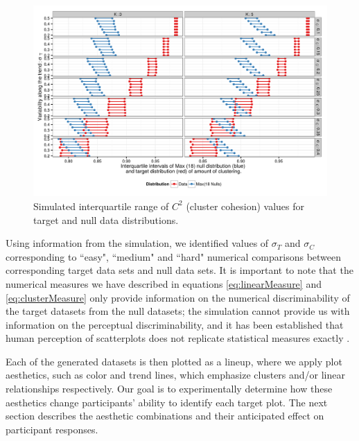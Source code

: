 \documentclass[11pt]{isuthesis}\usepackage[]{graphicx}\usepackage[]{color}
\newenvironment{knitrout}{}{} %
\begin{document}
\begin{figure}[ht]\centering
\begin{knitrout}
\color{fgcolor}

{\centering \includegraphics[width=.8\linewidth]{Figure/FeatureHierarchy/fig-simulationparameters-cluster-1} 

}



\end{knitrout}
\caption[Simulated interquartile range of $C^2$ cluster cohesion values]{Simulated interquartile range of $C^2$ (cluster cohesion) values for target and null data distributions. \label{fig:simulationClusterIntervals}}
\end{figure}

Using information from the simulation, we identified values of $\sigma_T$ and $\sigma_C$ corresponding to ``easy", ``medium" and ``hard" numerical comparisons between corresponding target data sets and null data sets. It is important to note that the numerical measures we have described in equations \eqref{eq:linearMeasure} and \eqref{eq:clusterMeasure} only provide information on the numerical discriminability of the target datasets from the null datasets; the simulation cannot provide us with information on the perceptual discriminability, and it has been established that human perception of scatterplots does not replicate statistical measures exactly \citep{bobko1979perception, mosteller1981eye, lewandowsky1989perception}.

Each of the generated datasets is then plotted as a lineup, where we apply plot aesthetics, such as color and trend lines, which emphasize clusters and/or linear relationships respectively. Our goal is to experimentally determine how these aesthetics change participants' ability to identify each target plot. The next section describes the aesthetic combinations and their anticipated effect on participant responses. 
\end{document}
